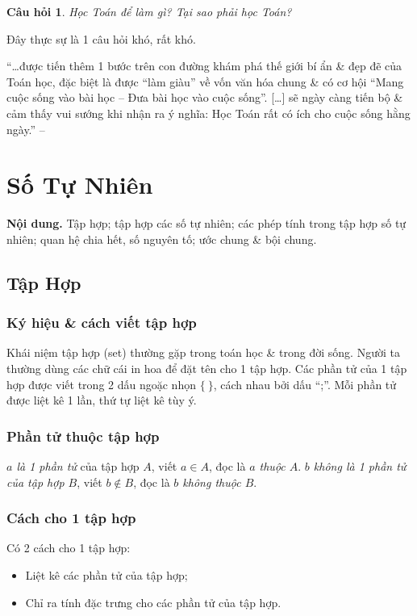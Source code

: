 \documentclass{article}
\numberwithin{equation}{section}
\newtheorem{question}{Câu hỏi}[section]
\begin{document}
\begin{question}
	Học Toán để làm gì? Tại sao phải học Toán?
\end{question}
Đây thực sự là 1 câu hỏi khó, rất khó.

``\ldots được tiến thêm 1 bước trên con đường khám phá thế giới bí ẩn \& đẹp đẽ của Toán học, đặc biệt là được ``làm giàu'' về vốn văn hóa chung \& có cơ hội ``Mang cuộc sống vào bài học -- Đưa bài học vào cuộc sống''. [\ldots] sẽ ngày càng tiến bộ \& cảm thấy vui sướng khi nhận ra ý nghĩa: Học Toán rất có ích cho cuộc sống hằng ngày.'' -- \cite[p. 1]{Thai_Anh_Dat_Ha_Loan_Nam_Quang_Toan_6_tap_1}


\section{Số Tự Nhiên}
\textbf{Nội dung.} Tập hợp; tập hợp các số tự nhiên; các phép tính trong tập hợp số tự nhiên; quan hệ chia hết, số nguyên tố; ước chung \& bội chung.

\subsection{Tập Hợp}

\subsubsection{Ký hiệu \& cách viết tập hợp}
Khái niệm tập hợp (set) thường gặp trong toán học \& trong đời sống. Người ta thường dùng các chữ cái in hoa để đặt tên cho 1 tập hợp. Các phần tử của 1 tập hợp được viết trong 2 dấu ngoặc nhọn $\{\ \}$, cách nhau bởi dấu ``;''. Mỗi phần tử được liệt kê 1 lần, thứ tự liệt kê tùy ý.

\subsubsection{Phần tử thuộc tập hợp}
\textit{$a$ là 1 phần tử} của tập hợp $A$, viết $a\in A$, đọc là \textit{$a$ thuộc $A$}. \textit{$b$ không là 1 phần tử của tập hợp $B$}, viết $b\notin B$, đọc là \textit{$b$ không thuộc $B$}.

\subsubsection{Cách cho 1 tập hợp}
Có 2 cách cho 1 tập hợp:
\begin{itemize}
	\item Liệt kê các phần tử của tập hợp;
	\item Chỉ ra tính đặc trưng cho các phần tử của tập hợp.
\end{itemize}
\end{document}
